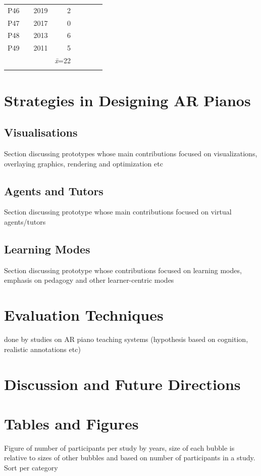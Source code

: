 \documentclass[manuscript,screen]{acmart}
\begin{document}
\begin{table}[]
\begin{tabular}{llrrcccl}
P46   & \citet{oku2019novel}                & 2019 & 2          &                  &       &            &               \\
P47   & \citet{birhanu2017interactive}      & 2017 & 0          &                  &       &            &               \\
P48   &  \citet{rahman2013hand}             & 2013 & 6          &                  &       &            &               \\
P49   & \citet{mostafizur2011application}   & 2011 & 5          &                  &       &            &               \\ \hline
   &    &  & \textit{\={x}}=22          &                  &       &            &               \\ \hline
\label{tab:overview}
\end{tabular}
\end{table}


\section{Strategies in Designing AR Pianos}
\subsection{Visualisations}
Section discussing prototypes whose main contributions focused on visualizations, overlaying graphics, rendering and optimization etc
\subsection{Agents and Tutors}
Section discussing prototype whose main contributions focused on virtual agents/tutors 
\subsection{Learning Modes}
Section discussing prototype whose contributions focused on learning modes, emphasis on pedagogy and other learner-centric modes
\section{Evaluation Techniques}
done by studies on AR piano teaching systems (hypothesis based on cognition, realistic annotations etc)
\section{Discussion and Future Directions}
\section{Tables and Figures}
Figure of number of participants per study by years, size of each bubble is relative to sizes of other bubbles and based on number of participants in a study. Sort per category 
\end{document}
